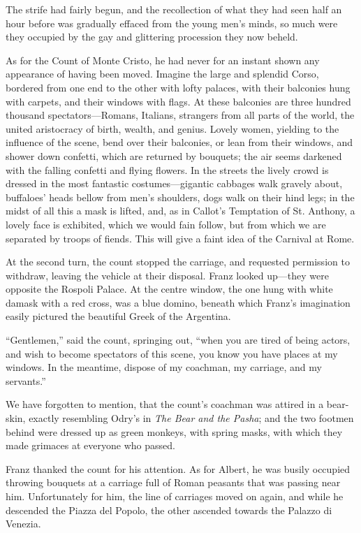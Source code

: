 The strife had fairly begun, and the recollection of what they had seen
half an hour before was gradually effaced from the young men’s minds,
so much were they occupied by the gay and glittering procession they
now beheld.

As for the Count of Monte Cristo, he had never for an instant shown any
appearance of having been moved. Imagine the large and splendid Corso,
bordered from one end to the other with lofty palaces, with their
balconies hung with carpets, and their windows with flags. At these
balconies are three hundred thousand spectators—Romans, Italians,
strangers from all parts of the world, the united aristocracy of birth,
wealth, and genius. Lovely women, yielding to the influence of the
scene, bend over their balconies, or lean from their windows, and
shower down confetti, which are returned by bouquets; the air seems
darkened with the falling confetti and flying flowers. In the streets
the lively crowd is dressed in the most fantastic costumes—gigantic
cabbages walk gravely about, buffaloes’ heads bellow from men’s
shoulders, dogs walk on their hind legs; in the midst of all this a
mask is lifted, and, as in Callot’s Temptation of St. Anthony, a lovely
face is exhibited, which we would fain follow, but from which we are
separated by troops of fiends. This will give a faint idea of the
Carnival at Rome.

At the second turn, the count stopped the carriage, and requested
permission to withdraw, leaving the vehicle at their disposal. Franz
looked up—they were opposite the Rospoli Palace. At the centre window,
the one hung with white damask with a red cross, was a blue domino,
beneath which Franz’s imagination easily pictured the beautiful Greek
of the Argentina.

“Gentlemen,” said the count, springing out, “when you are tired of
being actors, and wish to become spectators of this scene, you know you
have places at my windows. In the meantime, dispose of my coachman, my
carriage, and my servants.”

We have forgotten to mention, that the count’s coachman was attired in
a bear-skin, exactly resembling Odry’s in \textit{The Bear and the Pasha}; and
the two footmen behind were dressed up as green monkeys, with spring
masks, with which they made grimaces at everyone who passed.

Franz thanked the count for his attention. As for Albert, he was busily
occupied throwing bouquets at a carriage full of Roman peasants that
was passing near him. Unfortunately for him, the line of carriages
moved on again, and while he descended the Piazza del Popolo, the other
ascended towards the Palazzo di Venezia.

